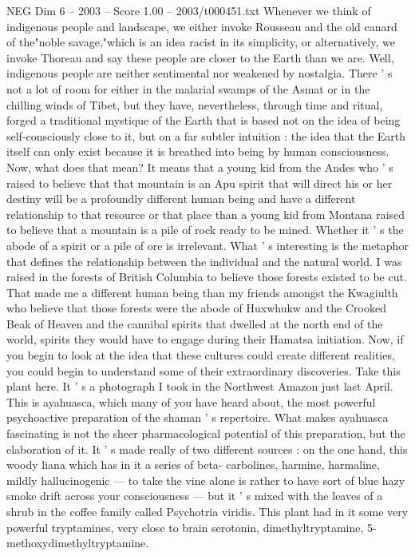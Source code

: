 \begin{textsample}{NEG Dim 6 – 2003 – Score 1.00 – 2003/t000451.txt}
Whenever we think of indigenous people and landscape, we either invoke Rousseau and the old canard of the"noble savage,"which is an idea racist in its simplicity, or alternatively, we invoke Thoreau and say these people are closer to the Earth than we are.
Well, indigenous people are neither sentimental nor weakened by nostalgia.
There ' s not a lot of room for either in the malarial swamps of the Asmat or in the chilling winds of Tibet, but they have, nevertheless, through time and ritual, forged a traditional mystique of the Earth that is based not on the idea of being self-consciously close to it, but on a far subtler intuition : the idea that the Earth itself can only exist because it is breathed into being by human consciousness.
Now, what does that mean?
It means that a young kid from the Andes who ' s raised to believe that that mountain is an Apu spirit that will direct his or her destiny will be a profoundly different human being and have a different relationship to that resource or that place than a young kid from Montana raised to believe that a mountain is a pile of rock ready to be mined.
Whether it ' s the abode of a spirit or a pile of ore is irrelevant.
What ' s interesting is the metaphor that defines the relationship between the individual and the natural world.
I was raised in the forests of British Columbia to believe those forests existed to be cut.
That made me a different human being than my friends amongst the Kwagiulth who believe that those forests were the abode of Huxwhukw and the Crooked Beak of Heaven and the cannibal spirits that dwelled at the north end of the world, spirits they would have to engage during their Hamatsa initiation.
Now, if you begin to look at the idea that these cultures could create different realities, you could begin to understand some of their extraordinary discoveries.
Take this plant here.
It ' s a photograph I took in the Northwest Amazon just last April.
This is ayahuasca, which many of you have heard about, the most powerful psychoactive preparation of the shaman ' s repertoire.
What makes ayahuasca fascinating is not the sheer pharmacological potential of this preparation, but the elaboration of it.
It ' s made really of two different sources : on the one hand, this woody liana which has in it a series of beta- carbolines, harmine, harmaline, mildly hallucinogenic — to take the vine alone is rather to have sort of blue hazy smoke drift across your consciousness — but it ' s mixed with the leaves of a shrub in the coffee family called Psychotria viridis.
This plant had in it some very powerful tryptamines, very close to brain serotonin, dimethyltryptamine, 5-methoxydimethyltryptamine.

\end{textsample}
